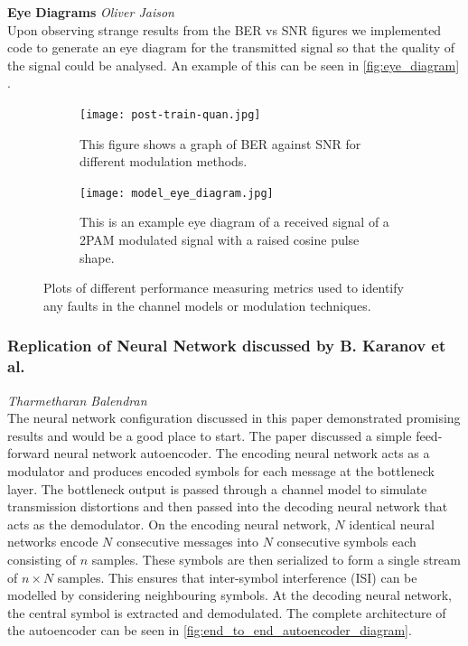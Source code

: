     \textbf{Eye Diagrams} \hspace*{0pt}\hfill \textit{Oliver Jaison}\\
    
    Upon observing strange results from the BER vs SNR figures we implemented code to generate an eye diagram for the transmitted signal so that the quality of the signal could be analysed. An example of this can be seen in \autoref{fig:eye_diagram} .
    
    \begin{figure}[H]
		\begin{subfigure}{0.5\textwidth}
			\centering
			\texttt{[image: post-train-quan.jpg]}
			\caption{This figure shows a graph of BER against SNR for different modulation methods.}
			\label{fig:ber_vs_snr}	
		\end{subfigure}
		\begin{subfigure}{0.5\textwidth}
			\centering
			\texttt{[image: model\_eye\_diagram.jpg]}
			\caption{This is an example eye diagram of a received signal of a 2PAM modulated signal with a raised cosine pulse shape.}
			\label{fig:eye_diagram}	
		\end{subfigure}
		\caption{Plots of different performance measuring metrics used to identify any faults in the channel models or modulation techniques.}
		\label{fig:optical_channel_model_signals}
	\end{figure}
    
    \subsubsection{Replication of Neural Network discussed by B. Karanov et al. \autocite{8433895}}
    \hspace*{0pt}\hfill \textit{Tharmetharan Balendran}\\
    
    The neural network configuration discussed in this paper demonstrated promising results and would be a good place to start. The paper discussed a simple feed-forward neural network autoencoder. The encoding neural network acts as a modulator and produces encoded symbols for each message at the bottleneck layer. The bottleneck output is passed through a channel model to simulate transmission distortions and then passed into the decoding neural network that acts as the demodulator. On the encoding neural network, $N$ identical neural networks encode $N$ consecutive messages into $N$ consecutive symbols each consisting of $n$ samples. These symbols are then serialized to form a single stream of $n\times N$ samples. This ensures that inter-symbol interference (ISI) can be modelled by considering neighbouring symbols. At the decoding neural network, the central symbol is extracted and demodulated. The complete architecture of the autoencoder can be seen in \autoref{fig:end_to_end_autoencoder_diagram}.
    
